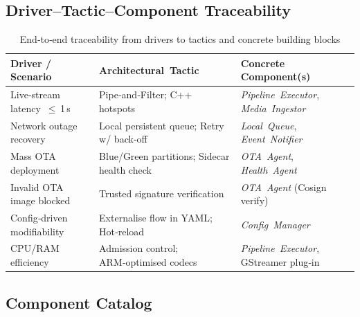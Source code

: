 \documentclass[11pt,a4paper]{article}
\begin{document}
\subsection{Driver–Tactic–Component Traceability}
\label{sec:traceability}
\begin{table}[H]
\centering
\setlength{\extrarowheight}{2pt}
\begin{tabular}{|p{2.6cm}|p{3.2cm}|p{4.2cm}|}
\hline
\textbf{Driver / Scenario} & \textbf{Architectural Tactic} & \textbf{Concrete Component(s)} \\ \hline
Live‑stream latency $\le$ 1 s & Pipe‑and‑Filter; C++ hotspots & \textit{Pipeline Executor}, \textit{Media Ingestor} \\ \hline
Network outage recovery & Local persistent queue; Retry w/ back‑off & \textit{Local Queue}, \textit{Event Notifier} \\ \hline
Mass OTA deployment & Blue/Green partitions; Sidecar health check & \textit{OTA Agent}, \textit{Health Agent} \\ \hline
Invalid OTA image blocked & Trusted signature verification & \textit{OTA Agent} (Cosign verify) \\ \hline
Config‑driven modifiability & Externalise flow in YAML; Hot‑reload & \textit{Config Manager} \\ \hline
CPU/RAM efficiency & Admission control; ARM‑optimised codecs & \textit{Pipeline Executor}, GStreamer plug‑in \\ \hline
\end{tabular}
\caption{End‑to‑end traceability from drivers to tactics and concrete building blocks}
\label{tab:driver_tactic}
\end{table}


\subsection{Component Catalog}
\end{document}
